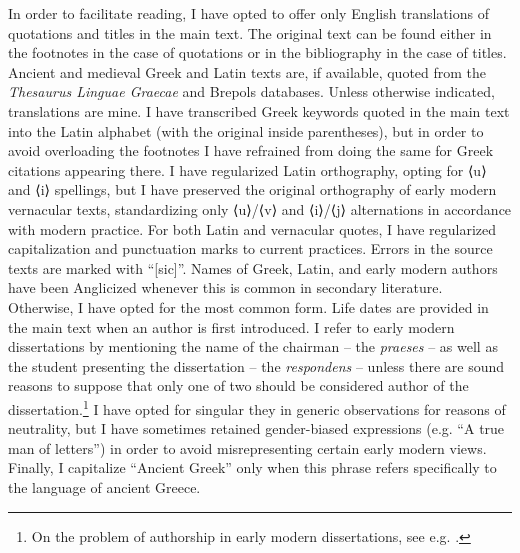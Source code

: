 \hypertarget{Toc19704800}{}
In order to facilitate reading, I have opted to offer only English translations of quotations and titles in the main text. The original text can be found either in the footnotes in the case of quotations or in the bibliography in the case of titles. Ancient and medieval Greek and Latin texts are, if available, quoted from the \textit{Thesaurus Linguae Graecae} and Brepols databases. Unless otherwise indicated, translations are mine. I have transcribed Greek keywords quoted in the main text into the Latin alphabet (with the original inside parentheses), but in order to avoid overloading the footnotes I have refrained from doing the same for Greek citations appearing there. I have regularized Latin orthography, opting for ⟨u⟩ and ⟨i⟩ spellings, but I have preserved the original orthography of early modern vernacular texts, standardizing only ⟨u⟩/⟨v⟩ and ⟨i⟩/⟨j⟩ alternations in accordance with modern practice. For both Latin and vernacular quotes, I have regularized capitalization and punctuation marks to current practices. Errors in the source texts are marked with “[sic]”. Names of Greek, Latin, and early modern authors have been Anglicized whenever this is common in secondary literature. Otherwise, I have opted for the most common form. Life dates are provided in the main text when an author is first introduced. I refer to early modern dissertations by mentioning the name of the chairman – the \textit{praeses} – as well as the student presenting the dissertation – the \textit{respondens} – unless there are sound reasons to suppose that only one of two should be considered author of the dissertation.\footnote{On the problem of authorship in early modern dissertations, see e.g. \citet{Considine2008b}.} I have opted for singular they in generic observations for reasons of neutrality, but I have sometimes retained gender-biased expressions (e.g. “A true man of letters”) in order to avoid misrepresenting certain early modern views. Finally, I capitalize “Ancient Greek” only when this phrase refers specifically to the language of ancient Greece.
